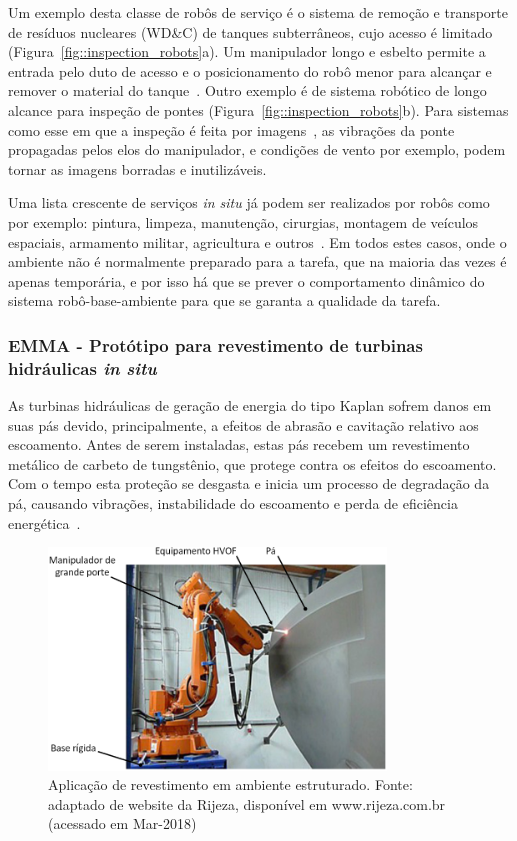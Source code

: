 Um exemplo desta classe de robôs de serviço é o sistema de remoção e transporte
de resíduos nucleares (WD\&C) de tanques subterrâneos, cujo acesso é limitado
(Figura~\ref{fig::inspection_robots}a). Um manipulador longo e esbelto permite
a entrada pelo duto de acesso e o posicionamento do robô menor para alcançar e
remover o material do tanque~\cite{knape1990development}. Outro exemplo é de
sistema robótico de longo alcance para inspeção de pontes
(Figura~\ref{fig::inspection_robots}b). Para sistemas como esse em que a
inspeção é feita por imagens~\cite{oh2009bridge}, as vibrações da ponte
propagadas pelos elos do manipulador, e condições de vento por exemplo, podem
tornar as imagens borradas e inutilizáveis.

Uma lista crescente de serviços \textit{in situ} já podem ser realizados por
robôs como por exemplo: pintura, limpeza, manutenção, cirurgias, montagem de
veículos espaciais, armamento militar, agricultura e
outros~\cite{nof1999handbook}. Em todos estes casos, onde o ambiente não é
normalmente preparado para a tarefa, que na maioria das vezes é apenas
temporária, e por isso há que se prever o comportamento dinâmico do sistema
robô-base-ambiente para que se garanta a qualidade da tarefa.


\subsubsection{EMMA - Protótipo para revestimento de turbinas
hidráulicas \textit{in situ}}

As turbinas hidráulicas de geração de energia do tipo Kaplan sofrem danos em
suas pás devido, principalmente, a efeitos de abrasão e cavitação relativo aos
escoamento.
Antes de serem instaladas, estas pás recebem um revestimento metálico de carbeto
de tungstênio, que protege contra os efeitos do escoamento. Com o tempo esta
proteção se desgasta e inicia um processo de degradação da pá, causando
vibrações, instabilidade do escoamento e perda de eficiência
energética~\cite{escaler2006detection}.

\begin{figure}[h]
	\centering 
 	\includegraphics[width=0.80\textwidth]{figs/rijeza_hvof}
 	\caption[Aplicação de revestimento em ambiente industrial]{Aplicação de
 	revestimento em ambiente estruturado.
 	Fonte: adaptado de website da Rijeza, disponível em www.rijeza.com.br
 	(acessado em Mar-2018)}
 	\label{fig::rijeza_hvof}
\end{figure}

